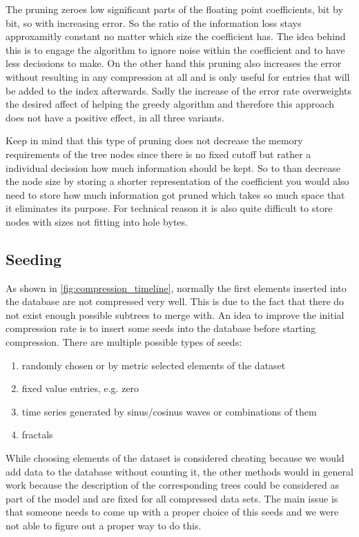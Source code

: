 The pruning zeroes low significant parts of the floating point coefficients, bit by bit, so with increasing error. So the ratio of the information loss stays approxamitly constant no matter which size the coefficient has. The idea behind this is to engage the algorithm to ignore noise within the coefficient and to have less decissions to make. On the other hand this pruning also increases the error without resulting in any compression at all and is only useful for entries that will be added to the index afterwards. Sadly the increase of the error rate overweights the desired affect of helping the greedy algorithm and therefore this approach does not have a positive effect, in all three variants.

Keep in mind that this type of pruning does not decrease the memory requirements of the tree nodes since there is no fixed cutoff but rather a individual decission how much information should be kept. So to than decrease the node size by storing a shorter representation of the coefficient you would also need to store how much information got pruned which takes so much space that it eliminates its purpose. For technical reason it is also quite difficult to store nodes with sizes not fitting into hole bytes.


\subsection{Seeding}
\label{ssec:algorithm:fail:seed}

As shown in \autoref{fig:compression_timeline}, normally the first elements inserted into the database are not compressed very well. This is due to the fact that there do not exist enough possible subtrees to merge with. An idea to improve the initial compression rate is to insert some seeds into the database before starting compression. There are multiple possible types of seeds:

\begin{enumerate}
    \item randomly chosen or by metric selected elements of the dataset
    \item fixed value entries, e.g. zero
    \item time series generated by sinus/cosinus waves or combinations of them
    \item fractals
\end{enumerate}

While choosing elements of the dataset is considered cheating because we would add data to the database without counting it, the other methods would in general work because the description of the corresponding trees could be considered as part of the model and are fixed for all compressed data sets. The main issue is that someone needs to come up with a proper choice of this seeds and we were not able to figure out a proper way to do this.
